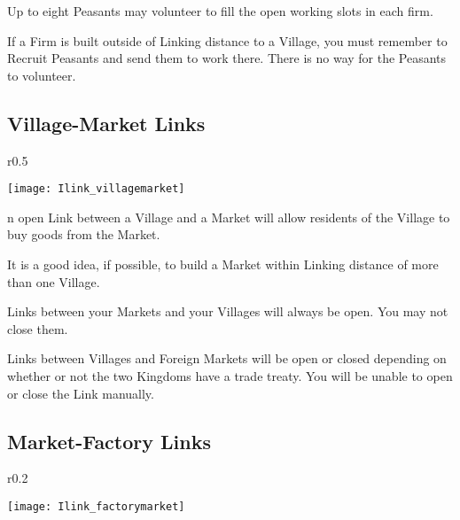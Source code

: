 Up to eight Peasants may volunteer to fill the open working slots in each firm.

If a Firm is built outside of Linking distance to a Village, you must remember to Recruit Peasants and send them to work there. There is no way for the Peasants to volunteer.

\clearpage

\subsection{Village-Market Links}


\begin{wrapfigure}{r}{0.5\textwidth}
	\vspace{-20pt}
	\begin{center}
		\texttt{[image: Ilink\_villagemarket]} %
	\end{center}
	\vspace{-20pt}
\end{wrapfigure}

n open Link between a Village and a Market will allow residents of the Village to buy goods from the Market.

It is a good idea, if possible, to build a Market within Linking distance of more than one Village.

Links between your Markets and your Villages will always be open. You may not close them.

Links between Villages and Foreign Markets will be open or closed depending on whether or not the two Kingdoms have a trade treaty. You will be unable to open or close the Link manually.

\subsection{Market-Factory Links}


\begin{wrapfigure}{r}{0.2\textwidth}
	\vspace{-20pt}
	\begin{center}
		\texttt{[image: Ilink\_factorymarket]} %
	\end{center}
	\vspace{-20pt}
\end{wrapfigure}

